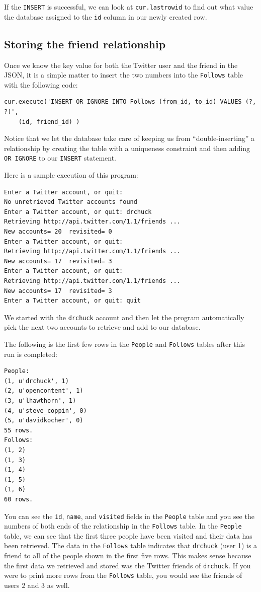 If the {\tt INSERT} is successful, we can look at {\tt cur.lastrowid} 
to find out what value the database assigned to the {\tt id} column in 
our newly created row.

\subsection{Storing the friend relationship}

Once we know the key value for both the Twitter user
and the friend in the JSON, it is a simple matter to insert
the two numbers into the {\tt Follows} table
with the following code:

\beforeverb
\begin{verbatim}
cur.execute('INSERT OR IGNORE INTO Follows (from_id, to_id) VALUES (?, ?)',
    (id, friend_id) )
\end{verbatim}
\afterverb
%
Notice that we let the database take care of keeping us from ``double-inserting''
a relationship by creating the table with a uniqueness constraint and then
adding {\tt OR IGNORE} to our {\tt INSERT} statement.

Here is a sample execution of this program:

\beforeverb
\begin{verbatim}
Enter a Twitter account, or quit: 
No unretrieved Twitter accounts found
Enter a Twitter account, or quit: drchuck
Retrieving http://api.twitter.com/1.1/friends ...
New accounts= 20  revisited= 0
Enter a Twitter account, or quit: 
Retrieving http://api.twitter.com/1.1/friends ...
New accounts= 17  revisited= 3
Enter a Twitter account, or quit: 
Retrieving http://api.twitter.com/1.1/friends ...
New accounts= 17  revisited= 3
Enter a Twitter account, or quit: quit
\end{verbatim}
\afterverb
%
We started with the {\tt drchuck} account and then let the program
automatically pick the next two accounts to retrieve and add to 
our database.

The following is the first few rows in the {\tt People} 
and {\tt Follows} tables after this run is completed:

\beforeverb
\begin{verbatim}
People:
(1, u'drchuck', 1)
(2, u'opencontent', 1)
(3, u'lhawthorn', 1)
(4, u'steve_coppin', 0)
(5, u'davidkocher', 0)
55 rows.
Follows:
(1, 2)
(1, 3)
(1, 4)
(1, 5)
(1, 6)
60 rows.
\end{verbatim}
\afterverb
%
You can see the {\tt id}, {\tt name}, and {\tt visited} fields in the 
{\tt People} table and you see the numbers of both ends of 
the relationship in the {\tt Follows} table.   
In the {\tt People} table, we can see that the first three people
have been visited and their data has been retrieved.
The data in the {\tt Follows} table indicates that
{\tt drchuck} (user 1) is a friend to all of the people shown in the first
five rows.  This makes sense because
the first data we retrieved and stored was the Twitter friends of
{\tt drchuck}.  If you were to print more rows from the {\tt Follows} table,
you would see the friends of users 2 and 3 as well.


